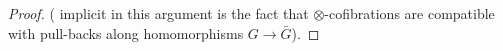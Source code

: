 \documentclass[a4paper,10pt
,draft
]{article}%
\numberwithin{equation}{section}
\numberwithin{figure}{section}
\newtheorem{lemma}[equation]{Lemma}%
\theoremstyle{definition} %
\newcommand{\vect}[1]{\text{\overrightharp{\ensuremath{#1}}}}
\newcommand{\Op}{\mathsf{Op}}%
\DeclareMathOperator{\Aut}{Aut}%
\newcommand{\F}{\ensuremath{\mathcal F}}
\newcommand{\V}{\ensuremath{\mathcal V}}
\renewcommand{\O}{\ensuremath{\mathcal O}}
\renewcommand{\P}{\ensuremath{\mathcal P}}
\newcommand{\1}{\ensuremath{\mathbbm 1}}%
\newcommand{\SC}{\Sigma_{\mathfrak C}}
\begin{document}
\begin{proof}

(\color{red} implicit in this argument is the fact that $\otimes$-cofibrations are compatible with pull-backs along homomorphisms 
$G \to \bar{G}$).
\end{proof}




\end{document}
